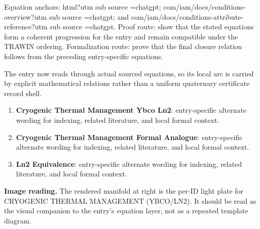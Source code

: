 Equation anchors: html?utm sub source =chatgpt; com/iam/docs/conditions-overview?utm sub source =chatgpt; and com/iam/docs/conditions-attribute-reference?utm sub source =chatgpt. Proof route: show that the stated equations form a coherent progression for the entry and remain compatible under the TRAWIN ordering. Formalization route: prove that the final closure relation follows from the preceding entry-specific equations.

The entry now reads through actual sourced equations, so its local arc is carried by explicit mathematical relations rather than a uniform quaternary certificate record shell.
\endgroup

\begin{enumerate}[leftmargin=1.6em,itemsep=6pt,topsep=4pt]
\item \textbf{Cryogenic Thermal Management Ybco Ln2}: entry-specific alternate wording for indexing, related literature, and local formal context.
\item \textbf{Cryogenic Thermal Management Formal Analogue}: entry-specific alternate wording for indexing, related literature, and local formal context.
\item \textbf{Ln2 Equivalence}: entry-specific alternate wording for indexing, related literature, and local formal context.
\end{enumerate}

\begin{samepage}
\noindent\begin{minipage}[t]{0.45\linewidth}
\vspace{0pt}
\raggedright
\scriptsize\textbf{Image reading.} The rendered manifold at right is the per-ID light plate for CRYOGENIC THERMAL MANAGEMENT (YBCO/LN2). It should be read as the visual companion to the entry's equation layer, not as a repeated template diagram.\par
\end{minipage}\hfill
\begin{minipage}[t]{0.53\linewidth}
\vspace*{-0.10in}
\raggedright
{}
\end{minipage}
\end{samepage}

\clearpage


